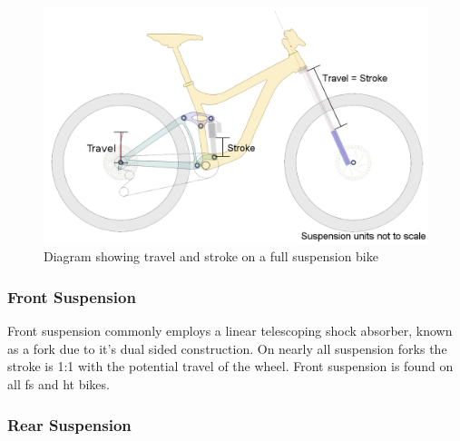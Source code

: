 	\begin{figure}[h!]
		\centering
		\includegraphics[width=12cm]{../images/reignschpath.PNG}
		\caption[Diagram showing travel and stroke on a full suspension bike]{Diagram showing 
			travel and stroke on a full suspension bike\footnotemark}
		\label{fig:travelvsstroke}
	\end{figure}
	\subsubsection{Front Suspension}
		Front suspension commonly employs a linear telescoping shock absorber, known as a \gls{fork} due to it's dual sided construction. On nearly all suspension \glspl{fork} the \gls{stroke} is 1:1 with the potential travel of the wheel. Front suspension is found on 
		all \gls{fs} and \gls{ht} bikes.
	\subsubsection{Rear Suspension}
		
